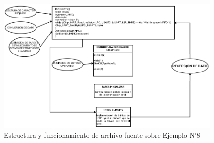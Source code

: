 \documentclass[12pt,letterpaper]{article}
\begin{document}
\begin{figure}[H]
\centering
\includegraphics[width=15 cm]{figuras/f39.png}
\caption{Estructura y funcionamiento de archivo fuente sobre Ejemplo N$^{\circ}$8}
\label{Fig46}
\end{figure}
\end{document}
